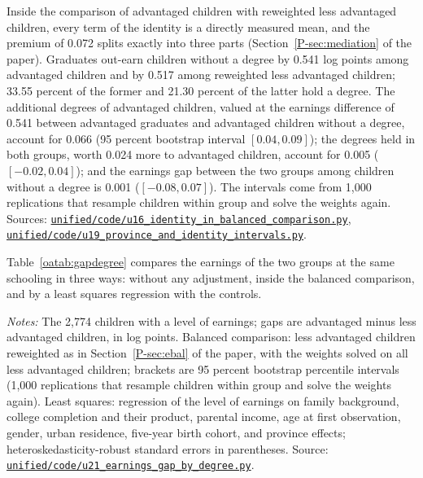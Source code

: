 \documentclass[11pt]{article}
\numberwithin{equation}{section}
\newcommand{\repourl}{https://github.com/JiachenJin1001/before-the-labor-market-or-inside-it}
\newcommand{\code}[1]{\href{\repourl/blob/main/#1}{\nolinkurl{#1}}}
\begin{document}
Inside the comparison of advantaged children with reweighted less advantaged children, every term of the identity is a directly measured mean, and the premium of 0.072 splits exactly into three parts (Section~\ref{P-sec:mediation} of the paper). Graduates out-earn children without a degree by 0.541 log points among advantaged children and by 0.517 among reweighted less advantaged children; 33.55 percent of the former and 21.30 percent of the latter hold a degree. The additional degrees of advantaged children, valued at the earnings difference of 0.541 between advantaged graduates and advantaged children without a degree, account for 0.066 (95 percent bootstrap interval $[0.04, 0.09]$); the degrees held in both groups, worth 0.024 more to advantaged children, account for 0.005 ($[-0.02, 0.04]$); and the earnings gap between the two groups among children without a degree is 0.001 ($[-0.08, 0.07]$). The intervals come from 1,000 replications that resample children within group and solve the weights again. Sources: \code{unified/code/u16_identity_in_balanced_comparison.py}, \code{unified/code/u19_province_and_identity_intervals.py}.

Table~\ref{oatab:gapdegree} compares the earnings of the two groups at the same schooling in three ways: without any adjustment, inside the balanced comparison, and by a least squares regression with the controls. 

\begin{table}[H]
\centering
\small
\caption{The gap in the level of earnings between advantaged and less advantaged children, by degree.}
\label{oatab:gapdegree}
\setlength{\tabcolsep}{4pt}

\par\smallskip
\begin{minipage}{0.94\textwidth}
\footnotesize\emph{Notes:} The 2,774 children with a level of earnings; gaps are advantaged minus less advantaged children, in log points. Balanced comparison: less advantaged children reweighted as in Section~\ref{P-sec:ebal} of the paper, with the weights solved on all less advantaged children; brackets are 95 percent bootstrap percentile intervals (1,000 replications that resample children within group and solve the weights again). Least squares: regression of the level of earnings on family background, college completion and their product, parental income, age at first observation, gender, urban residence, five-year birth cohort, and province effects; heteroskedasticity-robust standard errors in parentheses. Source: \code{unified/code/u21_earnings_gap_by_degree.py}.
\end{minipage}
\end{table}





{\small
}
\end{document}
